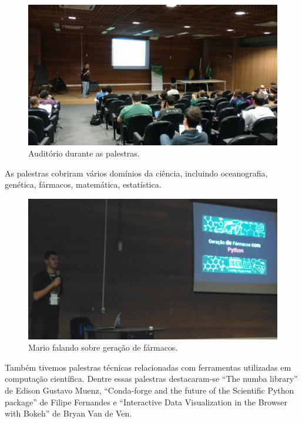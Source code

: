 \documentclass[12pt]{article}
\begin{document}
\begin{figure}[!htb]
\center
\includegraphics[height=.3\textheight]{talks-full.jpg}
\caption{Auditório durante as palestras.}
\end{figure}

As palestras cobriram vários domínios da ciência, incluindo
oceanografia,
genética,
fármacos,
matemática,
estatística.

\begin{figure}[!htb]
\center
\includegraphics[height=.3\textheight]{talks-drugs.jpg}
\caption{Mario falando sobre geração de fármacos.}
\end{figure}

Também tivemos palestras técnicas relacionadas com ferramentas utilizadas em
computação científica. Dentre essas palestras destacaram-se ``The numba
library'' de Edison Gustavo Muenz, ``Conda-forge and the future of the
Scientific Python package'' de Filipe Fernandes e ``Interactive Data
Visualization in the Browser with Bokeh'' de Bryan Van de Ven.
\end{document}
